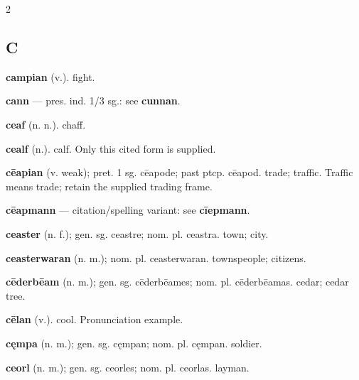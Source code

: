 \begin{multicols*}{2}
\subsection*{C}
\textbf{campian} (v.). fight.\par
\textbf{cann} — pres. ind. 1/3 sg.: see \textbf{cunnan}.\par
\textbf{ceaf} (n. n.). chaff.\par
\textbf{cealf} (n.). calf. Only this cited form is supplied.\par
\textbf{cēapian} (v. weak); pret. 1 sg. cēapode; past ptcp. cēapod. trade; traffic. Traffic means trade; retain the supplied trading frame.\par
\textbf{cēapmann} — citation/spelling variant: see \textbf{cīepmann}.\par
\textbf{ceaster} (n. f.); gen. sg. ceastre; nom. pl. ceastra. town; city.\par
\textbf{ceasterwaran} (n. m.); nom. pl. ceasterwaran. townspeople; citizens.\par
\textbf{cēderbēam} (n. m.); gen. sg. cēderbēames; nom. pl. cēderbēamas. cedar; cedar tree.\par
\textbf{cēlan} (v.). cool. Pronunciation example.\par
\textbf{cęmpa} (n. m.); gen. sg. cęmpan; nom. pl. cęmpan. soldier.\par
\textbf{ceorl} (n. m.); gen. sg. ceorles; nom. pl. ceorlas. layman.\par

\end{multicols*}
